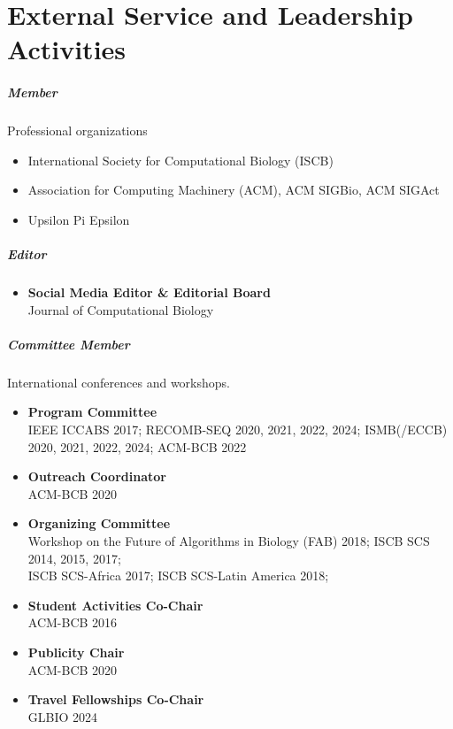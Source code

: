 \documentclass[10pt,letterpaper]{article}
\begin{document}
\section*{External Service and Leadership Activities}


\subparagraph{Member} Professional organizations
\begin{itemize}
\item International Society for Computational Biology (ISCB)
\item Association for Computing Machinery (ACM), ACM SIGBio, ACM SIGAct
\item Upsilon Pi Epsilon
\end{itemize}

\subparagraph{Editor} 
\begin{itemize}[leftmargin=!,labelindent=5pt,itemindent=-15pt]
	\item \textbf{Social Media Editor \& Editorial Board}\\
	Journal of Computational Biology
\end{itemize}

\subparagraph{Committee Member} International conferences and workshops.
\begin{itemize}[leftmargin=!,labelindent=5pt,itemindent=-15pt]
    \item \textbf{Program Committee} \\ IEEE ICCABS 2017; RECOMB-SEQ 2020, 2021, 2022, 2024; ISMB(/ECCB) 2020, 2021, 2022, 2024; ACM-BCB 2022
    \item \textbf{Outreach Coordinator} \\ ACM-BCB 2020
    \item \textbf{Organizing Committee} \\
    Workshop on the Future of Algorithms in Biology (FAB) 2018; 
    ISCB SCS 2014, 2015, 2017;  \\
    ISCB SCS\nobreakdash-Africa 2017; 
    ISCB SCS-Latin America 2018;  
    \item \textbf{Student Activities Co-Chair} \\ ACM-BCB 2016
    \item \textbf{Publicity Chair} \\ ACM-BCB 2020
    \item \textbf{Travel Fellowships Co-Chair}\\ GLBIO 2024
\end{itemize}
\end{document}
